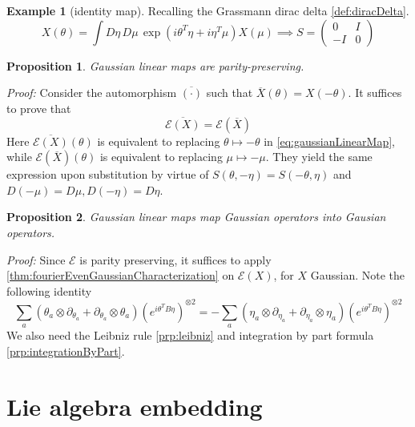 \documentclass[
]{book}
\newtheorem{proposition}{Proposition}[chapter]
\theoremstyle{definition}
\theoremstyle{definition}
\newtheorem{example}{Example}[chapter]
\theoremstyle{definition}
\theoremstyle{definition}
\theoremstyle{remark}
\begin{document}
\begin{example}[identity map]
\protect\hypertarget{exm:identityExample}{}\label{exm:identityExample}Recalling the Grassmann dirac delta \ref{def:diracDelta}.
\[ 
    X(\theta) = \int D\eta\, D\mu\, \exp(i\theta^T\eta + i\eta^T\mu) X(\mu) 
    \implies S = \begin{pmatrix}
        0 & I \\ -I & 0
    \end{pmatrix}
\]
\end{example}

\begin{proposition}
Gaussian linear maps are parity-preserving.
\end{proposition}

\emph{Proof:} Consider the automorphism \(\overline{(\cdot)}\)
such that \(\overline X(\theta) = X(-\theta)\). It suffices to prove that
\[ 
    \overline{\mathcal E(X)} = \mathcal E(\overline X)
\]
Here \(\overline{\mathcal E(X)}(\theta)\) is equivalent to replacing
\(\theta\mapsto -\theta\) in \eqref{eq:gaussianLinearMap}, while \(\mathcal E(\overline X)(\theta)\)
is equivalent to replacing \(\mu\mapsto -\mu\).
They yield the same expression upon substitution by virtue of \(S(\theta, -\eta) = S(-\theta, \eta)\)
and \(D(-\mu) = D\mu, D(-\eta) = D\eta\).

\begin{proposition}
Gaussian linear maps map Gaussian operators into Gausian operators.
\end{proposition}

\emph{Proof:} Since \(\mathcal E\) is parity preserving, it suffices to apply
\ref{thm:fourierEvenGaussianCharacterization} on \(\mathcal E(X)\), for \(X\) Gaussian.
Note the following identity
\begin{equation}
    \sum_a (\theta_a\otimes \partial_{\theta_a} + \partial_{\theta_a}\otimes \theta_a) 
        (e^{i\theta^TB\eta})^{\otimes 2}
    = -\sum_a (\eta_a\otimes \partial_{\eta_a} + \partial_{\eta_a}\otimes \eta_a) 
        (e^{i\theta^TB\eta})^{\otimes 2}
    \label{eq:convenientIdentity}
\end{equation}
We also need the Leibniz rule \ref{prp:leibniz} and integration
by part formula \ref{prp:integrationByPart}.

\section{Lie algebra embedding}\label{lie-algebra-embedding}
\end{document}
